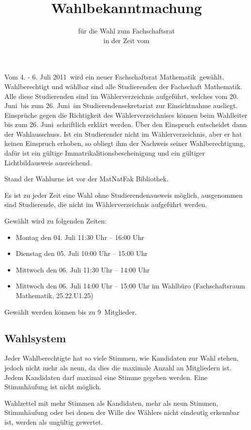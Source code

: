 \documentclass[a4paper,10pt]{scrartcl}
\title{Wahlbekanntmachung}
\subtitle{für die Wahl zum Fachschaftsrat \fach \\ in der Zeit vom \zeit}
\date{}
\def\fach{Mathematik}
\def\buero{Fachschaftsraum Mathematik, 25.22.U1.25}
\def\zeit{4. - 6. Juli 2011}
\def\einsichtStart{20. Juni}
\def\einsichtEnde{26. Juni}
\def\ort{ist vor der MatNatFak Bibliothek}
\def\maxWahl{9}
\begin{document}
\pagestyle{empty}
\thispagestyle{empty}
\renewcommand{\titlepagestyle}{empty}
\vspace{-0.5cm}
\maketitle
\vspace{-2cm}
Vom \zeit~wird ein neuer Fachschaftsrat \fach~gewählt. Wahlberechtigt und wählbar sind alle Studierenden der Fachschaft \fach.
Alle diese Studierenden sind im Wählerverzeichnis aufgeführt, welches vom \einsichtStart~bis zum \einsichtEnde~im Studierendensekretariat zur Einsichtnahme ausliegt. Einsprüche gegen die Richtigkeit des Wählerverzeichnises können beim Wahlleiter bis zum \einsichtEnde~schriftlich erklärt werden. Über den Einspruch entscheidet dann der Wahlausschuss. Ist ein Studierender nicht im Wählerverzeichnis, aber er hat keinen Einspruch erhoben, so obliegt ihm der Nachweis seiner Wahlberechtigung, dafür ist ein gültige Immatrikalitionsbescheinigung und ein gültiger Lichtbildausweis ausreichend.

Stand der Wahlurne \ort.

Es ist zu jeder Zeit eine Wahl ohne Studierendenausweis möglich, ausgenommen sind Studierende, die nicht im Wählerverzeichnis aufgeführt werden.

Gewählt wird zu folgenden Zeiten:
\begin{itemize}
\item Montag den 04. Juli 11:30 Uhr – 16:00 Uhr
\item Dienstag den 05. Juli 10:00 Uhr – 15:00 Uhr
\item Mittwoch den 06. Juli 11:30 Uhr – 14:00 Uhr 
\item Mittwoch den 06. Juli 14:00 Uhr – 15:00 Uhr im Wahlbüro (\buero) 
\end{itemize}

Gewählt werden können bis zu \maxWahl~Mitglieder.

\subsection*{Wahlsystem}
Jeder Wahlberechtigte hat so viele Stimmen, wie Kandidaten zur Wahl stehen, jedoch nicht mehr als neun, da dies die maximale Anzahl an Mitgliedern ist. Jedem Kandidaten darf maximal eine Stimme gegeben werden. Eine Stimmhäufung ist nicht möglich. 

Wahlzettel mit mehr Stimmen als Kandidaten, mehr als neun Stimmen, Stimmhäufung oder bei denen der Wille des Wählers nicht eindeutig erkennbar ist, werden als ungültig gewertet.
\end{document}
